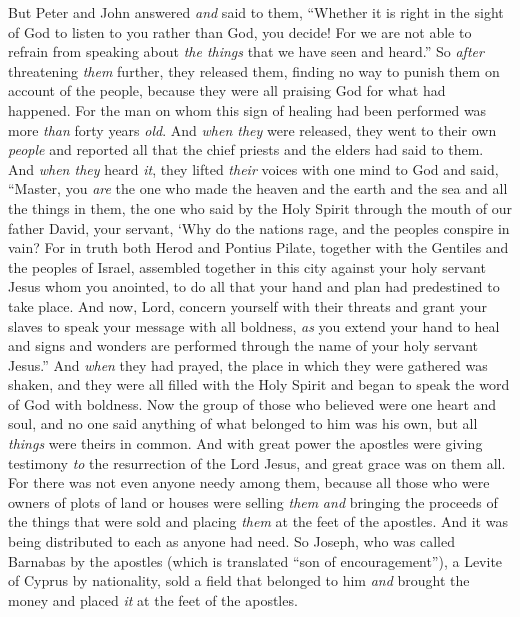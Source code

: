 \begin{biblechapter}
\verse But Peter and John answered \textit{and} said to them, “Whether it is right in the sight of God to listen to you rather than God, you decide!
\verse For we are not able to refrain from speaking about \textit{the things} that we have seen and heard.”
\verse So \textit{after} threatening \textit{them} further, they released them, finding no way to punish them on account of the people, because they were all praising God for what had happened.
\verse For the man on whom this sign of healing had been performed was more \textit{than} forty years \textit{old}.
 And \textit{when they} were released, they went to their own \textit{people} and reported all that the chief priests and the elders had said to them.
\verse And \textit{when they} heard \textit{it}, they lifted \textit{their} voices with one mind to God and said, “Master, you \textit{are} the one who made the heaven and the earth and the sea and all the things in them,
\verse the one who said by the Holy Spirit through the mouth of our father David, your servant,
\verse ‘Why do the nations rage, 
and the peoples conspire in vain?
\verse For in truth both Herod and Pontius Pilate, together with the Gentiles and the peoples of Israel, assembled together in this city against your holy servant Jesus whom you anointed,
\verse to do all that your hand and plan had predestined to take place.
\verse And now, Lord, concern yourself with their threats and grant your slaves to speak your message with all boldness,
\verse \textit{as} you extend your hand to heal and signs and wonders are performed through the name of your holy servant Jesus.”
\verse And \textit{when} they had prayed, the place in which they were gathered was shaken, and they were all filled with the Holy Spirit and began to speak the word of God with boldness.
 Now the group of those who believed were one heart and soul, and no one said anything of what belonged to him was his own, but all \textit{things} were theirs in common.
\verse And with great power the apostles were giving testimony \textit{to} the resurrection of the Lord Jesus, and great grace was on them all.
\verse For there was not even anyone needy among them, because all those who were owners of plots of land or houses were selling \textit{them} \textit{and} bringing the proceeds of the things that were sold
\verse and placing \textit{them} at the feet of the apostles. And it was being distributed to each as anyone had need.
\verse So Joseph, who was called Barnabas by the apostles (which is translated “son of encouragement”), a Levite of Cyprus by nationality,
\verse sold a field that belonged to him \textit{and} brought the money and placed \textit{it} at the feet of the apostles.
\end{biblechapter}


